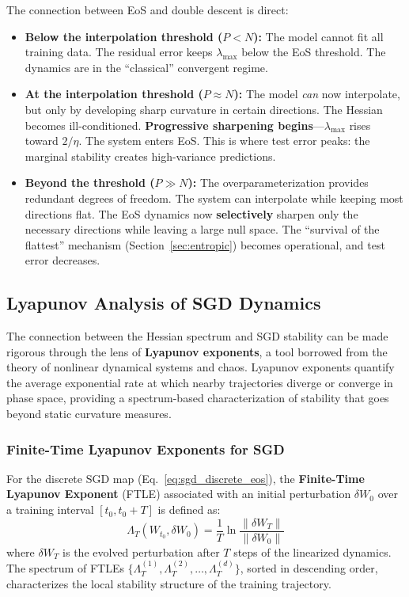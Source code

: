 \documentclass[
  journal=largetwo,
  year=2025,
  volume=37,
]{cup-journal}
\begin{document}
The connection between EoS and double descent is direct:
\begin{itemize}
    \item \textbf{Below the interpolation threshold ($P < N$):} The model cannot fit all training data. The residual error keeps $\lambda_{\max}$ below the EoS threshold. The dynamics are in the ``classical'' convergent regime.
    \item \textbf{At the interpolation threshold ($P \approx N$):} The model \textit{can} now interpolate, but only by developing sharp curvature in certain directions. The Hessian becomes ill-conditioned. \textbf{Progressive sharpening begins}---$\lambda_{\max}$ rises toward $2/\eta$. The system enters EoS. This is where test error peaks: the marginal stability creates high-variance predictions.
    \item \textbf{Beyond the threshold ($P \gg N$):} The overparameterization provides redundant degrees of freedom. The system can interpolate while keeping most directions flat. The EoS dynamics now \textbf{selectively} sharpen only the necessary directions while leaving a large null space. The ``survival of the flattest'' mechanism (Section~\ref{sec:entropic}) becomes operational, and test error decreases.
\end{itemize}

\subsection{Lyapunov Analysis of SGD Dynamics}\label{sec:lyapunov}

The connection between the Hessian spectrum and SGD stability can be made rigorous through the lens of \textbf{Lyapunov exponents}, a tool borrowed from the theory of nonlinear dynamical systems and chaos. Lyapunov exponents quantify the average exponential rate at which nearby trajectories diverge or converge in phase space, providing a spectrum-based characterization of stability that goes beyond static curvature measures.

\subsubsection{Finite-Time Lyapunov Exponents for SGD}

For the discrete SGD map (Eq.~\ref{eq:sgd_discrete_eos}), the \textbf{Finite-Time Lyapunov Exponent} (FTLE) associated with an initial perturbation $\delta W_0$ over a training interval $[t_0, t_0 + T]$ is defined as:
\begin{equation}\label{eq:ftle_def}
    \Lambda_T(W_{t_0}, \delta W_0) = \frac{1}{T} \ln \frac{\|\delta W_T\|}{\|\delta W_0\|}
\end{equation}
where $\delta W_T$ is the evolved perturbation after $T$ steps of the linearized dynamics. The spectrum of FTLEs $\{\Lambda_T^{(1)}, \Lambda_T^{(2)}, \ldots, \Lambda_T^{(d)}\}$, sorted in descending order, characterizes the local stability structure of the training trajectory.
\end{document}
